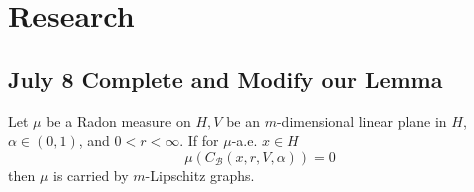 \section{Research}

\subsection{July 8 Complete and Modify our Lemma}

\begin{corollary}\label{LisaCoro7.1}
    Let $\mu$ be a Radon measure on $H, V$ be an $m$-dimensional linear plane in $H$, $\alpha \in(0,1)$, and $0<r<\infty$. If for $\mu$-a.e. $x \in H$
    $$
    \mu\left(C_{\mathcal{B}}(x, r, V, \alpha)\right)=0
    $$
    then $\mu$ is carried by $m$-Lipschitz graphs.
\end{corollary}



